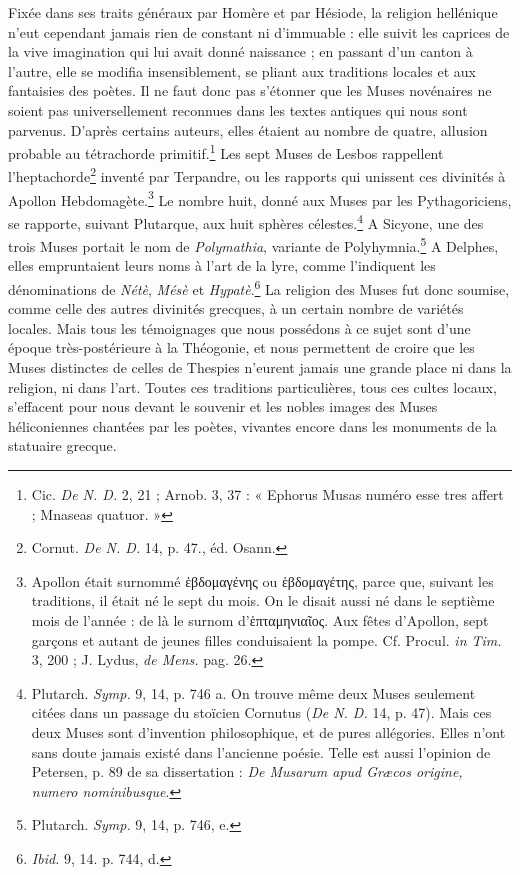 \documentclass[a4paper, 11pt, oneside, polutonikogreek, french]{article}
\begin{document}
Fixée dans ses traits généraux par Homère et par Hésiode, la religion hellénique n'eut cependant jamais rien de constant ni d'immuable : elle suivit les caprices de la vive imagination qui lui avait donné naissance ; en passant d'un canton à l'autre, elle se modifia insensiblement, se pliant aux traditions locales et aux fantaisies des poètes. Il ne faut donc pas s'étonner que les Muses novénaires ne soient pas universellement reconnues dans les textes antiques qui nous sont parvenus. D'après certains auteurs, elles étaient au nombre de quatre, allusion probable au tétrachorde primitif.\footnote{Cic. \emph{De N. D.} 2, 21 ; Arnob. 3, 37 : « Ephorus Musas numéro esse tres affert ; Mnaseas quatuor. »} Les sept Muses de Lesbos rappellent l'heptachorde\footnote{Cornut. \emph{De N. D.} 14, p. 47., éd. Osann.} inventé par Terpandre, ou les rapports qui unissent ces divinités à Apollon Hebdomagète.\footnote{Apollon était surnommé ἑβδομαγἐνης ou ἑβδομαγέτης, parce que, suivant les traditions, il était né le sept du mois. On le disait aussi né dans le septième mois de l'année : de là le surnom d'ἑπταμηνιαῖος. Aux fêtes d'Apollon, sept garçons et autant de jeunes filles conduisaient la pompe. Cf. Procul. \emph{in Tim.} 3, 200 ; J. Lydus, \emph{de Mens.} pag. 26.} Le nombre huit, donné aux Muses par les Pythagoriciens, se rapporte, suivant Plutarque, aux huit sphères célestes.\footnote{Plutarch. \emph{Symp.} 9, 14, p. 746 a. On trouve même deux Muses seulement citées dans un passage du stoïcien Cornutus (\emph{De N. D.} 14, p. 47). Mais ces deux Muses sont d'invention philosophique, et de pures allégories. Elles n'ont sans doute jamais existé dans l'ancienne poésie. Telle est aussi l'opinion de Petersen, p. 89 de sa dissertation : \emph{De Musarum apud Græcos origine, numero nominibusque}.} A Sicyone, une des trois Muses portait le nom de \emph{Polymathia}, variante de Polyhymnia.\footnote{Plutarch. \emph{Symp.} 9, 14, p. 746, e.} A Delphes, elles empruntaient leurs noms à l'art de la lyre, comme l'indiquent les dénominations de \emph{Nétè}, \emph{Mésè} et \emph{Hypatè}.\footnote{\emph{Ibid.} 9, 14. p. 744, d.} La religion des Muses fut donc soumise, comme celle des autres divinités grecques, à un certain nombre de variétés locales. Mais tous les témoignages que nous possédons à ce sujet sont d'une époque très-postérieure à la Théogonie, et nous permettent de croire que les Muses distinctes de celles de Thespies n'eurent jamais une grande place ni dans la religion, ni dans l'art. Toutes ces traditions particulières, tous ces cultes locaux, s'effacent pour nous devant le souvenir et les nobles images des Muses héliconiennes chantées par les poètes, vivantes encore dans les monuments de la statuaire grecque.
\clearpage
\end{document}
